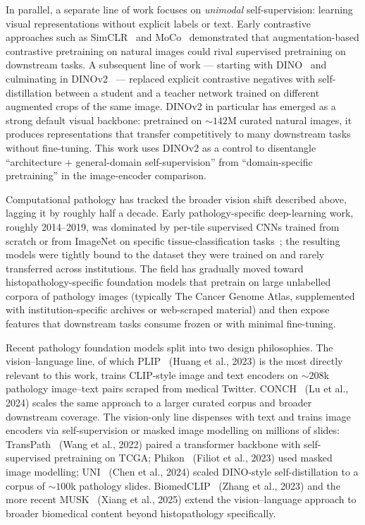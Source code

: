 In parallel, a separate line of work focuses on \emph{unimodal} self-supervision: learning visual representations without explicit labels or text. Early contrastive approaches such as SimCLR~\cite{chen2020simclr} and MoCo~\cite{he2020moco} demonstrated that augmentation-based contrastive pretraining on natural images could rival supervised pretraining on downstream tasks. A subsequent line of work --- starting with DINO~\cite{caron2021dino} and culminating in DINOv2~\cite{oquab2024dinov2} --- replaced explicit contrastive negatives with self-distillation between a student and a teacher network trained on different augmented crops of the same image. DINOv2 in particular has emerged as a strong default visual backbone: pretrained on $\sim 142$M curated natural images, it produces representations that transfer competitively to many downstream tasks without fine-tuning. This work uses DINOv2 as a control to disentangle ``architecture + general-domain self-supervision'' from ``domain-specific pretraining'' in the image-encoder comparison.

Computational pathology has tracked the broader vision shift described above, lagging it by roughly half a decade. Early pathology-specific deep-learning work, roughly 2014--2019, was dominated by per-tile supervised CNNs trained from scratch or from ImageNet on specific tissue-classification tasks~\cite{cruzroa2014idc,litjens2017survey,coudray2018lung}; the resulting models were tightly bound to the dataset they were trained on and rarely transferred across institutions. The field has gradually moved toward histopathology-specific foundation models that pretrain on large unlabelled corpora of pathology images (typically The Cancer Genome Atlas, supplemented with institution-specific archives or web-scraped material) and then expose features that downstream tasks consume frozen or with minimal fine-tuning.

Recent pathology foundation models split into two design philosophies. The vision--language line, of which PLIP~\cite{huang2023plip} (Huang et al., 2023) is the most directly relevant to this work, trains CLIP-style image and text encoders on $\sim 208$k pathology image--text pairs scraped from medical Twitter. CONCH~\cite{lu2024conch} (Lu et al., 2024) scales the same approach to a larger curated corpus and broader downstream coverage. The vision-only line dispenses with text and trains image encoders via self-supervision or masked image modelling on millions of slides: TransPath~\cite{wang2022transpath} (Wang et al., 2022) paired a transformer backbone with self-supervised pretraining on TCGA; Phikon~\cite{filiot2023phikon} (Filiot et al., 2023) used masked image modelling; UNI~\cite{chen2024uni} (Chen et al., 2024) scaled DINO-style self-distillation to a corpus of $\sim 100$k pathology slides. BiomedCLIP~\cite{zhang2023biomedclip} (Zhang et al., 2023) and the more recent MUSK~\cite{xiang2025musk} (Xiang et al., 2025) extend the vision--language approach to broader biomedical content beyond histopathology specifically.

